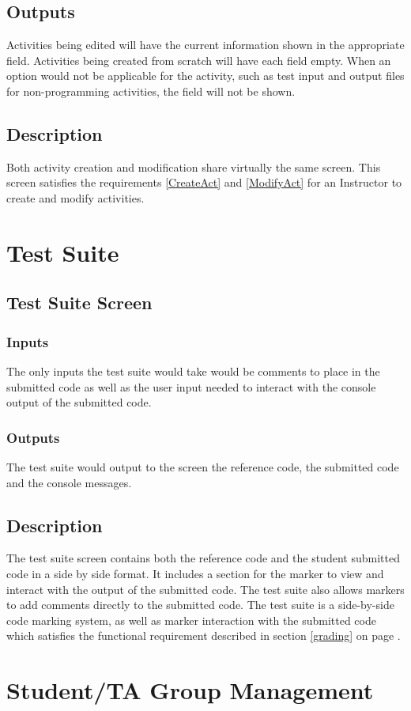 \documentclass{article}
\begin{document}
\subsection{Outputs}
Activities being edited will have the current information shown in the appropriate field.
Activities being created from scratch will have each field empty.
When an option would not be applicable for the activity, such as test input and output files
for non-programming activities, the field will not be shown.
\subsection{Description}
Both activity creation and modification share virtually the same screen.
This screen satisfies the requirements \ref{CreateAct} and \ref{ModifyAct} for an Instructor to create and modify activities.

\section{Test Suite}
\subsection{Test Suite Screen}
\subsubsection{Inputs}
The only inputs the test suite would take would be comments to place in the submitted code as well as the user input needed to interact with the console output of the submitted code.
\subsubsection{Outputs}
The test suite would output to the screen the reference code, the submitted code and the console messages.
\subsection{Description}
The test suite screen contains both the reference code and the student submitted code in a side by side format.  It includes a section for the marker to view and interact with the output of the submitted code.  The test suite also allows markers to add comments directly to the submitted code.  The test suite is a side-by-side code marking system, as well as marker interaction with the submitted code which satisfies the functional requirement described in section \ref{grading} on page \pageref{grading}.

\section{Student/TA Group Management}
\end{document}
